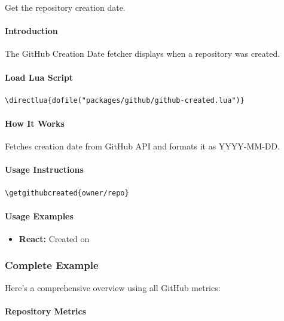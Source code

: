 \documentclass{article}
\begin{document}
Get the repository creation date.

\paragraph{Introduction}

The GitHub Creation Date fetcher displays when a repository was created.

\paragraph{Load Lua Script}

\begin{verbatim}
\directlua{dofile("packages/github/github-created.lua")}
\end{verbatim}

\paragraph{How It Works}

Fetches creation date from GitHub API and formats it as YYYY-MM-DD.

\paragraph{Usage Instructions}

\begin{verbatim}
\getgithubcreated{owner/repo}
\end{verbatim}

\paragraph{Usage Examples}

\begin{itemize}
    \item \textbf{React:} Created on 
\end{itemize}

\subsubsection{Complete Example}

Here's a comprehensive overview using all GitHub metrics:

\paragraph{Repository Metrics}
\end{document}
